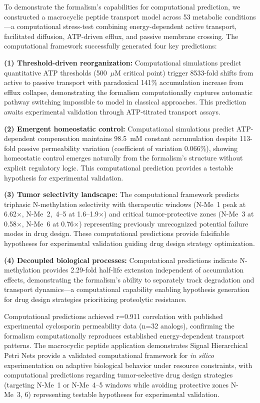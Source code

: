 \documentclass[10pt,letterpaper]{article}
\begin{document}
To demonstrate the formalism's capabilities for computational prediction, we constructed a macrocyclic peptide transport model across 53 metabolic conditions---a computational stress-test combining energy-dependent active transport, facilitated diffusion, ATP-driven efflux, and passive membrane crossing. The computational framework successfully generated four key predictions:

\textbf{(1) Threshold-driven reorganization:} Computational simulations predict quantitative ATP thresholds (500~$\mu$M critical point) trigger 8533-fold shifts from active to passive transport with paradoxical 141\% accumulation increase from efflux collapse, demonstrating the formalism computationally captures automatic pathway switching impossible to model in classical approaches. This prediction awaits experimental validation through ATP-titrated transport assays.

\textbf{(2) Emergent homeostatic control:} Computational simulations predict ATP-dependent compensation maintains 98.5~mM constant accumulation despite 113-fold passive permeability variation (coefficient of variation 0.066\%), showing homeostatic control emerges naturally from the formalism's structure without explicit regulatory logic. This computational prediction provides a testable hypothesis for experimental validation.

\textbf{(3) Tumor selectivity landscape:} The computational framework predicts triphasic N-methylation selectivity with therapeutic windows (N-Me~1 peak at 6.62$\times$, N-Me~2,~4--5 at 1.6--1.9$\times$) and critical tumor-protective zones (N-Me~3 at 0.58$\times$, N-Me~6 at 0.76$\times$) representing previously unrecognized potential failure modes in drug design. These computational predictions provide falsifiable hypotheses for experimental validation guiding drug design strategy optimization.

\textbf{(4) Decoupled biological processes:} Computational predictions indicate N-methylation provides 2.29-fold half-life extension independent of accumulation effects, demonstrating the formalism's ability to separately track degradation and transport dynamics---a computational capability enabling hypothesis generation for drug design strategies prioritizing proteolytic resistance.

Computational predictions achieved r=0.911 correlation with published experimental cyclosporin permeability data (n=32 analogs), confirming the formalism computationally reproduces established energy-dependent transport patterns. The macrocyclic peptide application demonstrates Signal Hierarchical Petri Nets provide a validated computational framework for \textit{in silico} experimentation on adaptive biological behavior under resource constraints, with computational predictions regarding tumor-selective drug design strategies (targeting N-Me~1 or N-Me~4--5 windows while avoiding protective zones N-Me~3, 6) representing testable hypotheses for experimental validation.
\end{document}
